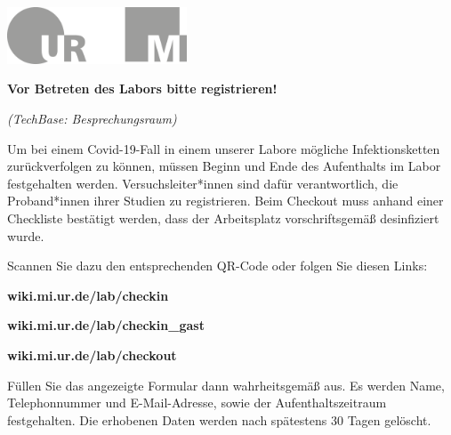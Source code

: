 \documentclass[24pt, a4paper, portrait]{article}
\begin{document}
\pagestyle{empty}

\raggedleft

\includegraphics[width=0.4\textwidth]{logo}

\vspace{1cm}
\sffamily
\centering
\huge

\textbf{Vor Betreten des Labors bitte registrieren!}

\vspace{0.5cm}
\Large
\textit{(TechBase: Besprechungsraum)}
\vspace{0.5cm}

\raggedright

Um bei einem Covid-19-Fall in einem unserer Labore mögliche Infektionsketten zurückverfolgen zu können, müssen Beginn und Ende des Aufenthalts im Labor festgehalten werden.
Versuchsleiter*innen sind dafür verantwortlich, die Proband*innen ihrer Studien zu registrieren.
Beim Checkout muss anhand einer Checkliste bestätigt werden, dass der Arbeitsplatz vorschriftsgemäß desinfiziert wurde.

\medskip

Scannen Sie dazu den entsprechenden QR-Code oder folgen Sie diesen Links:

\textbf{wiki.mi.ur.de/lab/checkin}

\textbf{wiki.mi.ur.de/lab/checkin\_gast}

\textbf{wiki.mi.ur.de/lab/checkout}

\medskip

Füllen Sie das angezeigte Formular dann wahrheitsgemäß aus.
Es werden Name, Telephonnummer und E-Mail-Adresse, sowie der Aufenthaltszeitraum festgehalten.
Die erhobenen Daten werden nach spätestens 30 Tagen gelöscht.

\vspace{1cm}
\centering
\end{document}
